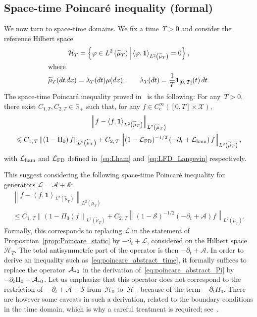 \documentclass[10pt]{amsart}
\theoremstyle{definition}\newtheorem{defi}[theo]{Definition}\newtheorem{rema}[theo]{Remark}\newtheorem{exam}[theo]{Example}\newtheorem{exem}[theo]{Example}\newtheorem{nota}[theo]{Notation}
\newcommand{\rmc}{\mathrm{c}}
\newcommand{\cL}{\mathcal{L}}
\newcommand{\cLs}{\mathcal{S}}
\newcommand{\cLa}{\mathcal{A}}
\newcommand{\cX}{\mathcal{X}}
\newcommand{\cH}{\mathcal{H}}
\newcommand{\R}{\mathbb{R}}
\newcommand{\bfun}{\mathbf{1}}
\newcommand{\cLham}{\mathcal{L}_{\rm ham}}
\newcommand{\cLFD}{\mathcal{L}_{\rm FD}}
\newcommand{\subplus}{\textnormal{\texttt{+}}}
\renewcommand{\leq}{\leqslant}
\begin{document}
\subsection{Space-time Poincaré inequality (formal)} We now turn to space-time domains. We fix a time~$T>0$ and consider the reference Hilbert space
\begin{gather*}
\cH_T = \left\{ \varphi \in L^2\left(\widetilde{\mu}_T\right) \, \middle| \, \left\langle \varphi,\bfun\right\rangle_{L^2\left(\widetilde{\mu}_T\right)} = 0 \right\},
\\
\intertext{where}
\widetilde{\mu}_T(dt \, dx) = \lambda_T(dt) \mu(dx), \qquad \lambda_T(dt) = \frac1T \bfun_{\left[0,\,T\right]}(t) \, dt.
\end{gather*}
The space-time Poincaré inequality proved in~\cite{AM19,CLW19} is the following: For any~$T>0$, there exist $C_{1,T},C_{2,T}\in \R_+$ such that, for any $f \in C_\rmc^\infty([0,T] \times \cX)$,
\begin{multline*}
\left\| f-\left\langle f,\bfun\right\rangle_{L^2\left(\widetilde{\mu}_T\right)}\right\|_{L^2\left(\widetilde{\mu}_T\right)} \\
\leq C_{1,\,T} \left\| \left(1-\Pi_0\right)f \right\|_{L^2\left(\widetilde{\mu}_T\right)} + C_{2,\,T} \left\| (1-\cLFD)^{-1/2}\left(-\partial_t + \cLham\right) f \right\|_{L^2\left(\widetilde{\mu}_T\right)},
\end{multline*}
with $\cLham$ and $\cLFD$ defined in~\eqref{eq:Lham} and~\eqref{eq:LFD_Langevin} respectively.

This suggest considering the following space-time Poincaré inequality for generators $\cL = \cLa + \cLs$:
\begin{multline}\label{eq:poincare_abstract_time}
\left\| f-\left\langle f,\bfun\right\rangle_{L^2\left(\widetilde{\mu}_T\right)}\right\|_{L^2\left(\widetilde{\mu}_T\right)} \\
\leq C_{1,\,T} \left\| (1-\Pi_0)f \right\|_{L^2\left(\widetilde{\mu}_T\right)} + C_{2,\,T} \left\| (1-\cLs)^{-1/2}\left(-\partial_t + \cLa\right) f \right\|_{L^2\left(\widetilde{\mu}_T\right)}.
\end{multline}
Formally, this corresponds to replacing $\cL$ in the statement of Proposition~\ref{prop:Poincare_static} by $-\partial_t + \cL$, considered on the Hilbert space~$\cH_T$. The total antisymmetric part of the operator is then $-\partial_t + \cLa$. In order to derive an inequality such as~\eqref{eq:poincare_abstract_time}, it formally suffices to replace the operator~$\cLa_{\subplus 0}$ in the derivation of~\eqref{eq:poincare_abstract_Pi} by $-\partial_t \Pi_0 + \cLa_{\subplus 0}$. Let us emphasize that this operator does not correspond to the restriction of~$-\partial_t + \cLa + \cLs$ from~$\cH_0$ to~$\cH_+$ because of the term~$-\partial_t \Pi_0$. There are however some caveats in such a derivation, related to the boundary conditions in the time domain, which is why a careful treatment is required; see~\cite[Lemma~2.6]{CLW19}.
\end{document}
